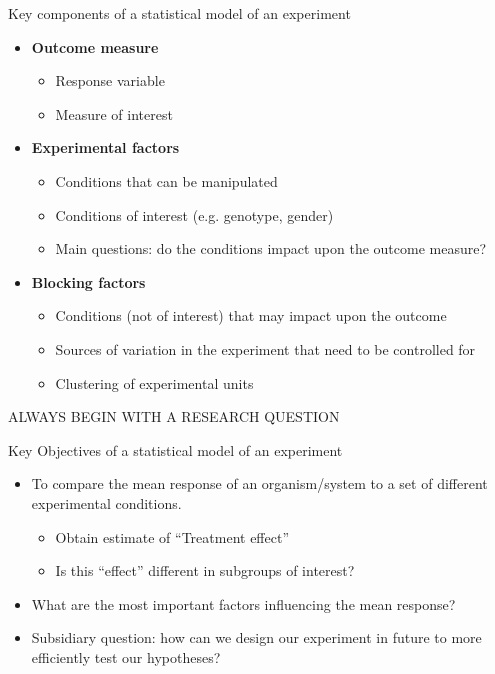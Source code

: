 \documentclass[10pt]{beamer}
\begin{document}
\begin{frame}{Key components of a statistical model of an experiment}
 \begin{itemize}
\item \textbf{Outcome measure}
  \begin{itemize}
    \item Response variable
    \item Measure of interest
  \end{itemize}
\item \textbf{Experimental factors}
  \begin{itemize}
    \item Conditions that can be manipulated 
    \item Conditions of interest (e.g. genotype, gender) 
    \item Main questions: do the conditions impact upon the outcome measure?
  \end{itemize}
\item \textbf{Blocking factors}
  \begin{itemize}
    \item Conditions (not of interest) that may impact upon the outcome
    \item Sources of variation in the experiment that need to be controlled for
    \item Clustering of experimental units
 \end{itemize}
\end{itemize}


ALWAYS BEGIN WITH A RESEARCH QUESTION
\end{frame}

\begin{frame}{Key Objectives of a statistical model of an experiment}
\begin{itemize}
 \item To compare the mean response of an organism/system to a set of different experimental conditions.
  \begin{itemize}
   \item Obtain estimate of “Treatment effect”
   \item Is this “effect” different in subgroups of interest?
  \end{itemize}
 \item What are the most important factors influencing the mean response? 
 \item Subsidiary question: how can we design our experiment in future to more efficiently test our hypotheses?
\end{itemize}


\end{frame}
\end{document}
